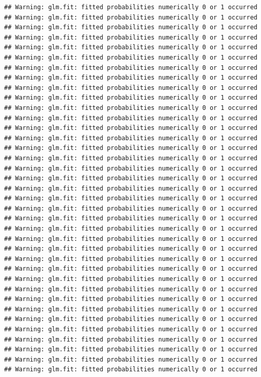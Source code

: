 \documentclass[
]{article}
\begin{document}
\begin{verbatim}
## Warning: glm.fit: fitted probabilities numerically 0 or 1 occurred
## Warning: glm.fit: fitted probabilities numerically 0 or 1 occurred
## Warning: glm.fit: fitted probabilities numerically 0 or 1 occurred
## Warning: glm.fit: fitted probabilities numerically 0 or 1 occurred
## Warning: glm.fit: fitted probabilities numerically 0 or 1 occurred
## Warning: glm.fit: fitted probabilities numerically 0 or 1 occurred
## Warning: glm.fit: fitted probabilities numerically 0 or 1 occurred
## Warning: glm.fit: fitted probabilities numerically 0 or 1 occurred
## Warning: glm.fit: fitted probabilities numerically 0 or 1 occurred
## Warning: glm.fit: fitted probabilities numerically 0 or 1 occurred
## Warning: glm.fit: fitted probabilities numerically 0 or 1 occurred
## Warning: glm.fit: fitted probabilities numerically 0 or 1 occurred
## Warning: glm.fit: fitted probabilities numerically 0 or 1 occurred
## Warning: glm.fit: fitted probabilities numerically 0 or 1 occurred
## Warning: glm.fit: fitted probabilities numerically 0 or 1 occurred
## Warning: glm.fit: fitted probabilities numerically 0 or 1 occurred
## Warning: glm.fit: fitted probabilities numerically 0 or 1 occurred
## Warning: glm.fit: fitted probabilities numerically 0 or 1 occurred
## Warning: glm.fit: fitted probabilities numerically 0 or 1 occurred
## Warning: glm.fit: fitted probabilities numerically 0 or 1 occurred
## Warning: glm.fit: fitted probabilities numerically 0 or 1 occurred
## Warning: glm.fit: fitted probabilities numerically 0 or 1 occurred
## Warning: glm.fit: fitted probabilities numerically 0 or 1 occurred
## Warning: glm.fit: fitted probabilities numerically 0 or 1 occurred
## Warning: glm.fit: fitted probabilities numerically 0 or 1 occurred
## Warning: glm.fit: fitted probabilities numerically 0 or 1 occurred
## Warning: glm.fit: fitted probabilities numerically 0 or 1 occurred
## Warning: glm.fit: fitted probabilities numerically 0 or 1 occurred
## Warning: glm.fit: fitted probabilities numerically 0 or 1 occurred
## Warning: glm.fit: fitted probabilities numerically 0 or 1 occurred
## Warning: glm.fit: fitted probabilities numerically 0 or 1 occurred
## Warning: glm.fit: fitted probabilities numerically 0 or 1 occurred
## Warning: glm.fit: fitted probabilities numerically 0 or 1 occurred
## Warning: glm.fit: fitted probabilities numerically 0 or 1 occurred
## Warning: glm.fit: fitted probabilities numerically 0 or 1 occurred
## Warning: glm.fit: fitted probabilities numerically 0 or 1 occurred
## Warning: glm.fit: fitted probabilities numerically 0 or 1 occurred

\end{verbatim}
\end{document}
